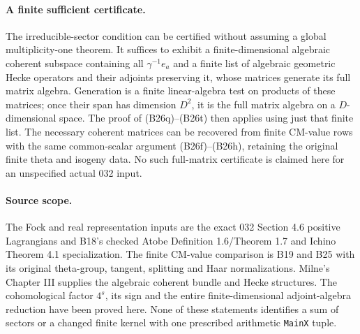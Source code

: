 \paragraph{A finite sufficient certificate.}
The irreducible-sector condition can be certified without
assuming a global multiplicity-one theorem.  It suffices
to exhibit a finite-dimensional algebraic coherent
subspace containing all $\gamma^{-1}e_a$ and a finite
list of algebraic geometric Hecke operators and their
adjoints preserving it, whose matrices generate its full
matrix algebra.  Generation is a finite linear-algebra
test on products of these matrices; once their span has
dimension $D^2$, it is the full matrix algebra on a
$D$-dimensional space.  The proof of (B26q)--(B26t)
then applies using just that finite list.  The necessary
coherent matrices can be recovered from finite CM-value
rows with the same common-scalar argument (B26f)--(B26h),
retaining the original finite theta and isogeny data.
No such full-matrix certificate is claimed here for an
unspecified actual 032 input.

\paragraph{Source scope.}
The Fock and real representation inputs are the exact
032 Section 4.6 positive Lagrangians and B18's checked
Atobe Definition 1.6/Theorem 1.7 and Ichino Theorem 4.1
specialization.  The finite CM-value comparison is B19
and B25 with its original theta-group, tangent, splitting
and Haar normalizations.  Milne's Chapter III supplies
the algebraic coherent bundle and Hecke structures.
The cohomological factor $4^s$, its sign and the entire
finite-dimensional adjoint-algebra reduction have been
proved here.  None of these statements identifies a sum
of sectors or a changed finite kernel with one prescribed
arithmetic \texttt{MainX} tuple.
